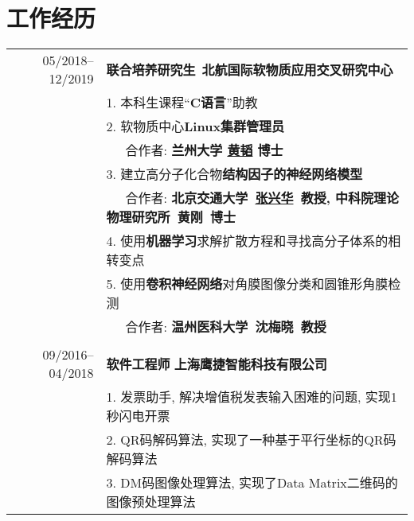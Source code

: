 \documentclass[a4paper,10pt]{article} %
\begin{document}
\section{工作经历}
\begin{tabular}{r|p{11cm}}
	05/2018--12/2019            & \textbf{联合培养研究生}\ \textbf{北航国际软物质应用交叉研究中心}  \\
	& 1. 本科生课程“\textbf{C语言}”助教 \\
	& 2. 软物质中心\textbf{Linux集群管理员}\\ &\ \ \ 合作者: \textbf{兰州大学 \href{http://taohonker.science/}{黄韬} 博士}\\
	& 3. 建立高分子化合物\textbf{结构因子的神经网络模型}\\ &\ \ \ 合作者: \textbf{北京交通大学\ \href{http://faculty.bjtu.edu.cn/8522/}{张兴华}\ 教授, 中科院理论物理研究所\ 黄刚\ 博士} \\
	& 4. 使用\textbf{机器学习}求解扩散方程和寻找高分子体系的相转变点\\
	& 5. 使用\textbf{卷积神经网络}对角膜图像分类和圆锥形角膜检测\\ & \ \ \ 合作者: \textbf{温州医科大学\ 沈梅晓\ 教授}\\
	\multicolumn{2}{c}{} \\	%
	09/2016--04/2018            & \textbf{软件工程师}  \textbf{上海鹰捷智能科技有限公司} \\                          & 1. 发票助手, 解决增值税发表输入困难的问题, 实现1秒闪电开票\\
	& 2. QR码解码算法, 实现了一种基于平行坐标的QR码解码算法\\
	
	& 3. DM码图像处理算法, 实现了Data Matrix二维码的图像预处理算法\\
\end{tabular}
\end{document}

